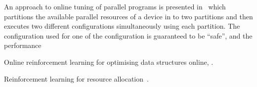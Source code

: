 
An approach to online tuning of parallel programs is presented in~\cite{Ansel2012} which partitions the available parallel resources of a device in to two partitions and then executes two different configurations simultaneously using each partition. The configuration used for one of the configuration is guaranteed to be ``safe'', and the performance

Online reinforcement learning for optimising data structures online, \cite{Tesauro2005}.

Reinforcement learning for resource allocation~\cite{Eastep2011}.



%
%

